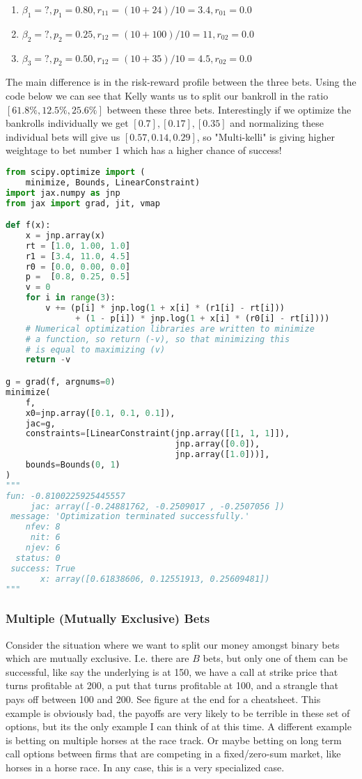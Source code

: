 \documentclass{article}
\begin{document}
\begin{enumerate}
    \item $\beta_1=?, p_1=0.80, r_{11} = (10 + 24)/10 = 3.4, r_{01} = 0.0$
    \item $\beta_2=?, p_2=0.25, r_{12} = (10 + 100)/10 = 11, r_{02} = 0.0$
    \item $\beta_3=?, p_2=0.50, r_{12} = (10 + 35)/10 = 4.5, r_{02} = 0.0$
\end{enumerate}
The main difference is in the risk-reward profile between the three bets. Using the code below we can see that Kelly wants us to split our bankroll in the ratio $[61.8\%, 12.5\%, 25.6\%]$ between these three bets. Interestingly if we optimize the bankrolls individually we get $[0.7], [0.17], [0.35]$ and normalizing these individual bets will give us $[0.57, 0.14, 0.29]$, so "Multi-kelli" is giving higher weightage to bet number 1 which has a higher chance of success!
\begin{lstlisting}[language=Python]
from scipy.optimize import (
    minimize, Bounds, LinearConstraint)
import jax.numpy as jnp
from jax import grad, jit, vmap

def f(x):
    x = jnp.array(x)
    rt = [1.0, 1.00, 1.0]
    r1 = [3.4, 11.0, 4.5]
    r0 = [0.0, 0.00, 0.0]
    p =  [0.8, 0.25, 0.5]
    v = 0
    for i in range(3):
        v += (p[i] * jnp.log(1 + x[i] * (r1[i] - rt[i]))
              + (1 - p[i]) * jnp.log(1 + x[i] * (r0[i] - rt[i])))
    # Numerical optimization libraries are written to minimize
    # a function, so return (-v), so that minimizing this
    # is equal to maximizing (v)
    return -v

g = grad(f, argnums=0)
minimize(
    f,
    x0=jnp.array([0.1, 0.1, 0.1]), 
    jac=g, 
    constraints=[LinearConstraint(jnp.array([[1, 1, 1]]),
                                  jnp.array([0.0]),
                                  jnp.array([1.0]))],
    bounds=Bounds(0, 1)
)
"""
fun: -0.8100225925445557
     jac: array([-0.24881762, -0.2509017 , -0.2507056 ])
 message: 'Optimization terminated successfully.'
    nfev: 8
     nit: 6
    njev: 6
  status: 0
 success: True
       x: array([0.61838606, 0.12551913, 0.25609481])
"""
\end{lstlisting}

\subsubsection{Multiple (Mutually Exclusive) Bets}
Consider the situation where we want to split our money amongst binary bets which are mutually exclusive. I.e. there are $B$ bets, but only one of them can be successful, like say the underlying is at 150, we have a call at strike price that turns profitable at 200, a put that turns profitable at 100, and a strangle that pays off between 100 and 200.  See figure at the end for a cheatsheet. This example is obviously bad, the payoffs are very likely to be terrible in these set of options, but its the only example I can think of at this time. A different example is betting on multiple horses at the race track. Or maybe betting on long term call options between firms that are competing in a fixed/zero-sum market, like horses in a horse race. In any case, this is a very specialized case. 
\end{document}

